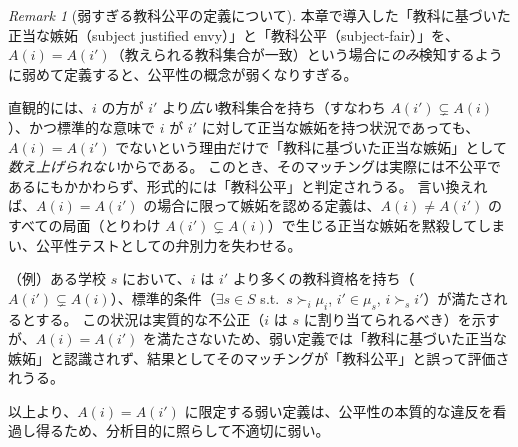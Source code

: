 \documentclass[12pt, a4paper]{article}
\theoremstyle{definition}
\theoremstyle{remark}
\newtheorem{remark}{Remark}
\theoremstyle{plain}
\begin{document}






\bigbreak

\begin{remark}[弱すぎる教科公平の定義について]
本章で導入した「教科に基づいた正当な嫉妬（subject justified envy）」と「教科公平（subject-fair）」を、
$A(i)=A(i')$（教えられる教科集合が一致）という場合に\emph{のみ}検知するように弱めて定義すると、公平性の概念が弱くなりすぎる。

直観的には、$i$ の方が $i'$ より\emph{広い}教科集合を持ち（すなわち $A(i') \subsetneq A(i)$）、かつ標準的な意味で $i$ が $i'$ に対して正当な嫉妬を持つ状況であっても、$A(i)=A(i')$ でないという理由だけで「教科に基づいた正当な嫉妬」として\emph{数え上げられない}からである。
このとき、そのマッチングは実際には不公平であるにもかかわらず、形式的には「教科公平」と判定されうる。
言い換えれば、$A(i)=A(i')$ の場合に限って嫉妬を認める定義は、$A(i)\neq A(i')$ のすべての局面（とりわけ $A(i') \subsetneq A(i)$）で生じる正当な嫉妬を黙殺してしまい、公平性テストとしての弁別力を失わせる。

（例）ある学校 $s$ において、$i$ は $i'$ より多くの教科資格を持ち（$A(i') \subsetneq A(i)$）、標準的条件（$\exists s\in S$ s.t.\ $s \succ_i \mu_i$, $i'\in \mu_s$, $i \succ_s i'$）が満たされるとする。
この状況は実質的な不公正（$i$ は $s$ に割り当てられるべき）を示すが、$A(i)=A(i')$ を満たさないため、弱い定義では「教科に基づいた正当な嫉妬」と認識されず、結果としてそのマッチングが「教科公平」と誤って評価されうる。

以上より、$A(i)=A(i')$ に限定する弱い定義は、公平性の本質的な違反を看過し得るため、分析目的に照らして不適切に弱い。
\end{remark}
\end{document}
